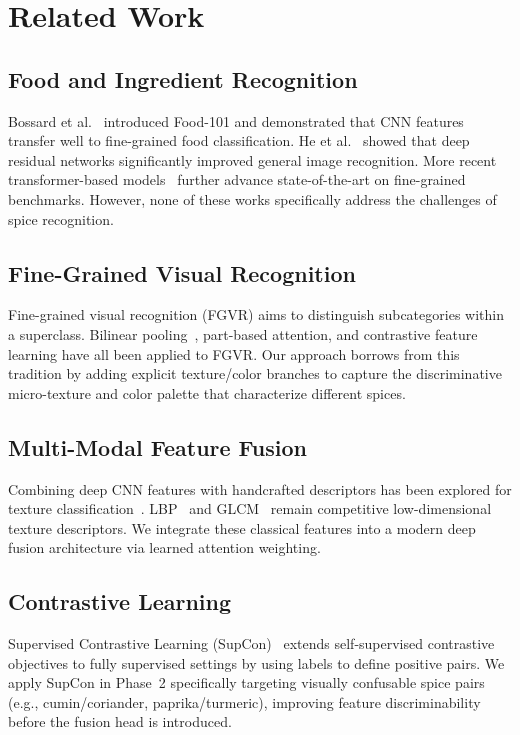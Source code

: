 \documentclass[conference]{IEEEtran}
\begin{document}
\section{Related Work}
\label{sec:related}

\subsection{Food and Ingredient Recognition}
Bossard et al.~\cite{bossard14} introduced Food-101 and demonstrated that CNN
features transfer well to fine-grained food classification. He et al.~\cite{he2016deep}
showed that deep residual networks significantly improved general image recognition.
More recent transformer-based models~\cite{dosovitskiy2020image} further advance
state-of-the-art on fine-grained benchmarks. However, none of these works
specifically address the challenges of spice recognition.

\subsection{Fine-Grained Visual Recognition}
Fine-grained visual recognition (FGVR) aims to distinguish subcategories within a
superclass. Bilinear pooling~\cite{lin2015bilinear}, part-based attention, and
contrastive feature learning have all been applied to FGVR. Our approach borrows
from this tradition by adding explicit texture/color branches to capture the
discriminative micro-texture and color palette that characterize different spices.

\subsection{Multi-Modal Feature Fusion}
Combining deep CNN features with handcrafted descriptors has been explored for
texture classification~\cite{cimpoi2014describing}. LBP~\cite{ojala2002multiresolution}
and GLCM~\cite{haralick1973textural} remain competitive low-dimensional texture
descriptors. We integrate these classical features into a modern deep fusion
architecture via learned attention weighting.

\subsection{Contrastive Learning}
Supervised Contrastive Learning (SupCon)~\cite{khosla2020supervised} extends
self-supervised contrastive objectives to fully supervised settings by using labels
to define positive pairs. We apply SupCon in Phase~2 specifically targeting visually
confusable spice pairs (e.g., cumin/coriander, paprika/turmeric), improving feature
discriminability before the fusion head is introduced.
\end{document}
